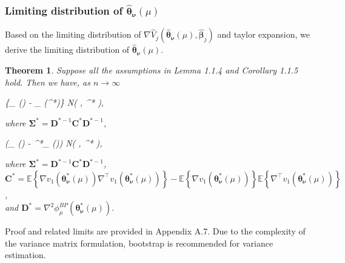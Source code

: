 \documentclass[12pt]{article}
\newcommand{\wh}{\widehat}
\newcommand{\itl}{\intercal}
\newcommand{\bs}{ \boldsymbol}
\newcommand{\lt}{\left}
\newcommand{\rt}{\right}
\newtheorem{theorem}{Theorem}[section]
\begin{document}
\subsubsection{Limiting distribution of $\widehat{\bs{\theta}}_{\bs{\nu}}\lt(\mu\rt)$}
Based on the limiting distribution of $\nabla\wh{V}_j\lt(\wh{\bs{\theta}}_{\bs{\nu}}\lt(\mu\rt)  , \wh{\bs{\beta}}_j\rt)$ and taylor expansion, we derive the limiting distribution of $\widehat{\bs{\theta}}_{\bs{\nu}}\lt(\mu\rt)$.
\begin{theorem}
	Suppose all the assumptions in Lemma 1.1.4 and Corollary 1.1.5 hold. Then we have, as $n\to \infty$
	\begin{flalign*}
	\lt\{\widehat{\bs{\theta}}_{\bs{\nu}}(\mu) - \bs{\theta}_{\bs{\nu}}(\mu^*)\rt\}  N\lt(\bs{0}, \bs{\Sigma}^* \rt),
	\end{flalign*}
	where $\bs{\Sigma}^* = \bs{D}^{*-1}\bs{C}^{*}\bs{D}^{*-1}$, 
	
	\begin{flalign*}
	\lt(\widehat{\bs{\theta}}_{\bs{\nu}}(\mu) - \bs{\theta}^*_{\bs{\nu}}(\mu)\rt)  N\lt(\bs{0}, \bs{\Sigma}^* \rt),
	\end{flalign*}
	where $\bs{\Sigma}^* = \bs{D}^{*-1}\bs{C}^{*}\bs{D}^{*-1}$, \\
	$\bs{C}^* =\mathbb{E}\lt\{  \nabla v_1\lt(\bs{\theta}^*_{\bs{\nu}}(\mu)\rt)\nabla^{\itl} v_1\lt(\bs{\theta}^*_{\bs{\nu}}(\mu)\rt) \rt\} - \mathbb{E}\lt\{\nabla v_1\lt(\bs{\theta}^*_{\bs{\nu}}(\mu)\rt)\rt\} \mathbb{E}\lt\{\nabla^{\itl} v_1\lt(\bs{\theta}^*_{\bs{\nu}}(\mu)\rt)\rt\}$,\\
	and $\bs{D}^*  =  \nabla^2 \phi_{\mu}^{BP}(\bs{\theta}^*_{\bs{\nu}}(\mu))$.
\end{theorem}
Proof and related limits are provided in Appendix A.7.  Due to the complexity of the variance matrix formulation, bootstrap is recommended for variance estimation.
\end{document}
